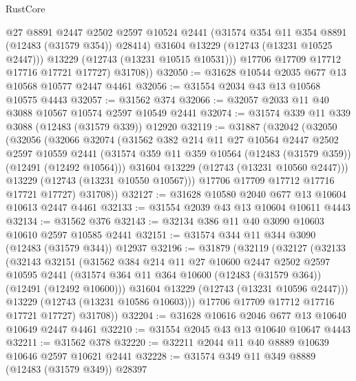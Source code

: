 \begin{lexlean}{RustCore}
\begin{coremodule}
              @27
              @8891
              @2447
              @2502
              @2597
              @10524
              @2441
              (@31574 @354 @11 @354 @8891 (@12483 (@31579 @354)) @28414)
              @31604
              @13229
              (@12743 (@13231 @10525 @2447)))
            @13229
            (@12743 (@13231 @10515 @10531)))
          @17706
          @17709
          @17712
          @17716
          @17721
          @17727)
        @31708))
@32050 := @31628 @10544 @2035 @677 @13 @10568 @10577 @2447 @4461
@32056 := @31554 @2034 @43 @13 @10568 @10575 @4443
@32057 := @31562 @374
@32066 := @32057 @2033 @11 @40 @3088 @10567 @10574 @2597 @10549 @2441
@32074 := @31574 @339 @11 @339 @3088 (@12483 (@31579 @339)) @12920
@32119 := @31887
    (@32042
      (@32050
        (@32056
          (@32066
            @32074
            (@31562
              @382
              @214
              @11
              @27
              @10564
              @2447
              @2502
              @2597
              @10559
              @2441
              (@31574 @359 @11 @359 @10564 (@12483 (@31579 @359)) (@12491 (@12492 @10564)))
              @31604
              @13229
              (@12743 (@13231 @10560 @2447)))
            @13229
            (@12743 (@13231 @10550 @10567)))
          @17706
          @17709
          @17712
          @17716
          @17721
          @17727)
        @31708))
@32127 := @31628 @10580 @2040 @677 @13 @10604 @10613 @2447 @4461
@32133 := @31554 @2039 @43 @13 @10604 @10611 @4443
@32134 := @31562 @376
@32143 := @32134 @386 @11 @40 @3090 @10603 @10610 @2597 @10585 @2441
@32151 := @31574 @344 @11 @344 @3090 (@12483 (@31579 @344)) @12937
@32196 := @31879
    (@32119
      (@32127
        (@32133
          (@32143
            @32151
            (@31562
              @384
              @214
              @11
              @27
              @10600
              @2447
              @2502
              @2597
              @10595
              @2441
              (@31574 @364 @11 @364 @10600 (@12483 (@31579 @364)) (@12491 (@12492 @10600)))
              @31604
              @13229
              (@12743 (@13231 @10596 @2447)))
            @13229
            (@12743 (@13231 @10586 @10603)))
          @17706
          @17709
          @17712
          @17716
          @17721
          @17727)
        @31708))
@32204 := @31628 @10616 @2046 @677 @13 @10640 @10649 @2447 @4461
@32210 := @31554 @2045 @43 @13 @10640 @10647 @4443
@32211 := @31562 @378
@32220 := @32211 @2044 @11 @40 @8889 @10639 @10646 @2597 @10621 @2441
@32228 := @31574 @349 @11 @349 @8889 (@12483 (@31579 @349)) @28397

\end{coremodule}
\end{lexlean}

